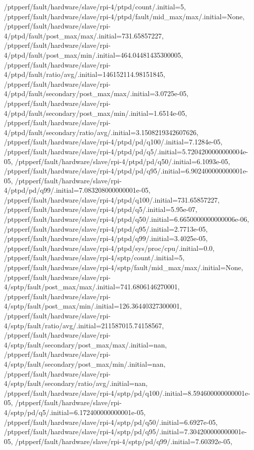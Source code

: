 {    /ptpperf/fault/hardware/slave/rpi-4/ptpd/count/.initial=5,
    /ptpperf/fault/hardware/slave/rpi-4/ptpd/fault/mid_max/max/.initial=None,
    /ptpperf/fault/hardware/slave/rpi-4/ptpd/fault/post_max/max/.initial=731.65857227,
    /ptpperf/fault/hardware/slave/rpi-4/ptpd/fault/post_max/min/.initial=464.04481435300005,
    /ptpperf/fault/hardware/slave/rpi-4/ptpd/fault/ratio/avg/.initial=146152114.98151845,
    /ptpperf/fault/hardware/slave/rpi-4/ptpd/fault/secondary/post_max/max/.initial=3.0725e-05,
    /ptpperf/fault/hardware/slave/rpi-4/ptpd/fault/secondary/post_max/min/.initial=1.6514e-05,
    /ptpperf/fault/hardware/slave/rpi-4/ptpd/fault/secondary/ratio/avg/.initial=3.1508219342607626,
    /ptpperf/fault/hardware/slave/rpi-4/ptpd/pd/q100/.initial=7.1284e-05,
    /ptpperf/fault/hardware/slave/rpi-4/ptpd/pd/q5/.initial=5.7204200000000004e-05,
    /ptpperf/fault/hardware/slave/rpi-4/ptpd/pd/q50/.initial=6.1093e-05,
    /ptpperf/fault/hardware/slave/rpi-4/ptpd/pd/q95/.initial=6.902400000000001e-05,
    /ptpperf/fault/hardware/slave/rpi-4/ptpd/pd/q99/.initial=7.083208000000001e-05,
    /ptpperf/fault/hardware/slave/rpi-4/ptpd/q100/.initial=731.65857227,
    /ptpperf/fault/hardware/slave/rpi-4/ptpd/q5/.initial=5.95e-07,
    /ptpperf/fault/hardware/slave/rpi-4/ptpd/q50/.initial=6.6650000000000006e-06,
    /ptpperf/fault/hardware/slave/rpi-4/ptpd/q95/.initial=2.7713e-05,
    /ptpperf/fault/hardware/slave/rpi-4/ptpd/q99/.initial=3.4025e-05,
    /ptpperf/fault/hardware/slave/rpi-4/ptpd/sys/proc/cpu/.initial=0.0,
    /ptpperf/fault/hardware/slave/rpi-4/sptp/count/.initial=5,
    /ptpperf/fault/hardware/slave/rpi-4/sptp/fault/mid_max/max/.initial=None,
    /ptpperf/fault/hardware/slave/rpi-4/sptp/fault/post_max/max/.initial=741.6806146270001,
    /ptpperf/fault/hardware/slave/rpi-4/sptp/fault/post_max/min/.initial=126.36440327300001,
    /ptpperf/fault/hardware/slave/rpi-4/sptp/fault/ratio/avg/.initial=211587015.74158567,
    /ptpperf/fault/hardware/slave/rpi-4/sptp/fault/secondary/post_max/max/.initial=nan,
    /ptpperf/fault/hardware/slave/rpi-4/sptp/fault/secondary/post_max/min/.initial=nan,
    /ptpperf/fault/hardware/slave/rpi-4/sptp/fault/secondary/ratio/avg/.initial=nan,
    /ptpperf/fault/hardware/slave/rpi-4/sptp/pd/q100/.initial=8.594600000000001e-05,
    /ptpperf/fault/hardware/slave/rpi-4/sptp/pd/q5/.initial=6.172400000000001e-05,
    /ptpperf/fault/hardware/slave/rpi-4/sptp/pd/q50/.initial=6.6927e-05,
    /ptpperf/fault/hardware/slave/rpi-4/sptp/pd/q95/.initial=7.304200000000001e-05,
    /ptpperf/fault/hardware/slave/rpi-4/sptp/pd/q99/.initial=7.60392e-05,
}

